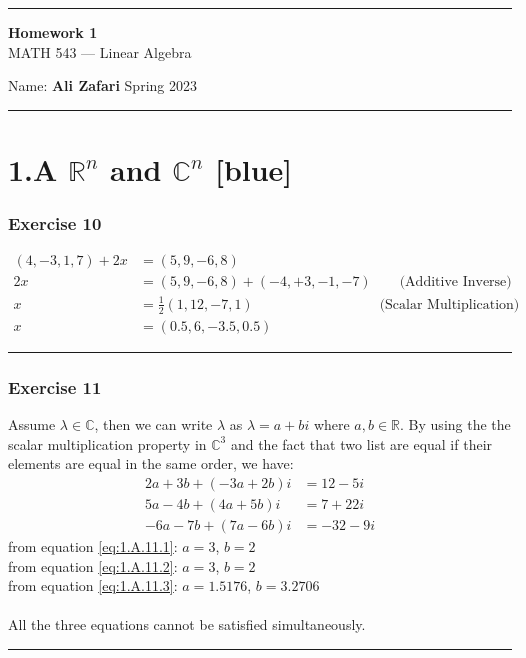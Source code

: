 \documentclass[12pt, letterpaper]{scrartcl}
\newcommand{\R}{\mathbb{R}}
\newcommand{\C}{\mathbb{C}}
\begin{document}
\begin{center}
    \hrule
    \vspace{0.4cm}
    { \textbf{{\large Homework 1}} \\ MATH 543 --- Linear Algebra}
\end{center}
{ Name: \textbf{Ali Zafari} \hspace{\fill} Spring 2023 } \newline\hrule

\section*{1.A $\R^n$ and $\C^n$ \xrfill[2pt]{3pt}[blue]}
\subsubsection*{Exercise 10}
\begin{align*}
    (4,-3,1,7) + 2x &= (5,9,-6,8)\\
    2x &= (5,9,-6,8) + (-4,+3,-1,-7) \qquad\text{(Additive Inverse)}\\
    x &= \frac{1}{2}(1,12,-7,1) \qquad\qquad\qquad\quad\quad\quad\text{(Scalar Multiplication)}\\
    x &= (0.5,6,-3.5,0.5)
\end{align*}
\vskip1mm\hrule

\subsubsection*{Exercise 11}
Assume $\lambda \in \C$, then we can write $\lambda$ as $\lambda=a+bi$ where $a,b\in\R$. By using the the scalar multiplication property in $\C^3$ and the fact that two list are equal if their elements are equal in the same order, we have:
\begin{align}
    2a+3b + (-3a+2b)i&=12-5i \label{eq:1.A.11.1}\\
    5a-4b + (4a+5b)i&=7+22i \label{eq:1.A.11.2}\\
    -6a-7b + (7a-6b)i&=-32-9i \label{eq:1.A.11.3}
\end{align}
from equation \ref{eq:1.A.11.1}: $a=3$, $b=2$\\
from equation \ref{eq:1.A.11.2}: $a=3$, $b=2$\\
from equation \ref{eq:1.A.11.3}: $a=1.5176$, $b=3.2706$\\\\
All the three equations cannot be satisfied simultaneously.
\vskip1mm\hrule
\end{document}

